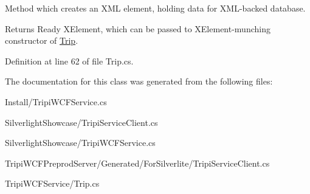 Method which creates an XML element, holding data for XML-\/backed database. \begin{DoxyReturn}{Returns}
Ready XElement, which can be passed to XElement-\/munching constructor of \hyperlink{class_tripi_w_c_f_1_1_service_1_1_trip}{Trip}.
\end{DoxyReturn}


Definition at line 62 of file Trip.cs.

The documentation for this class was generated from the following files:\begin{DoxyCompactItemize}
\item 
Install/TripiWCFService.cs\item 
SilverlightShowcase/TripiServiceClient.cs\item 
SilverlightShowcase/TripiWCFService.cs\item 
TripiWCFPreprodServer/Generated/ForSilverlite/TripiServiceClient.cs\item 
TripiWCFService/Trip.cs\end{DoxyCompactItemize}
